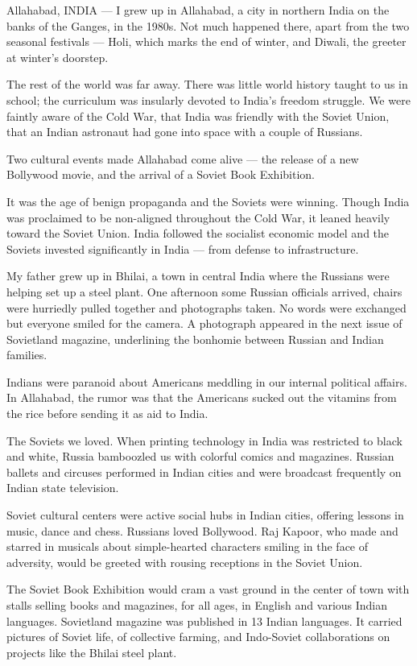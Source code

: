 Allahabad, INDIA --- I grew up in Allahabad, a city in northern India on
the banks of the Ganges, in the 1980s. Not much happened there, apart
from the two seasonal festivals --- Holi, which marks the end of winter,
and Diwali, the greeter at winter's doorstep.

The rest of the world was far away. There was little world history
taught to us in school; the curriculum was insularly devoted to India's
freedom struggle. We were faintly aware of the Cold War, that India was
friendly with the Soviet Union, that an Indian astronaut had gone into
space with a couple of Russians.

Two cultural events made Allahabad come alive --- the release of a new
Bollywood movie, and the arrival of a Soviet Book Exhibition.

It was the age of benign propaganda and the Soviets were winning. Though
India was proclaimed to be non-aligned throughout the Cold War, it
leaned heavily toward the Soviet Union. India followed the socialist
economic model and the Soviets invested significantly in India --- from
defense to infrastructure.

My father grew up in Bhilai, a town in central India where the Russians
were helping set up a steel plant. One afternoon some Russian officials
arrived, chairs were hurriedly pulled together and photographs taken. No
words were exchanged but everyone smiled for the camera. A photograph
appeared in the next issue of Sovietland magazine, underlining the
bonhomie between Russian and Indian families.

Indians were paranoid about Americans meddling in our internal political
affairs. In Allahabad, the rumor was that the Americans sucked out the
vitamins from the rice before sending it as aid to India.

The Soviets we loved. When printing technology in India was restricted
to black and white, Russia bamboozled us with colorful comics and
magazines. Russian ballets and circuses performed in Indian cities and
were broadcast frequently on Indian state television.

Soviet cultural centers were active social hubs in Indian cities,
offering lessons in music, dance and chess. Russians loved Bollywood.
Raj Kapoor, who made and starred in musicals about simple-hearted
characters smiling in the face of adversity, would be greeted with
rousing receptions in the Soviet Union.

The Soviet Book Exhibition would cram a vast ground in the center of
town with stalls selling books and magazines, for all ages, in English
and various Indian languages. Sovietland magazine was published in 13
Indian languages. It carried pictures of Soviet life, of collective
farming, and Indo-Soviet collaborations on projects like the Bhilai
steel plant.

